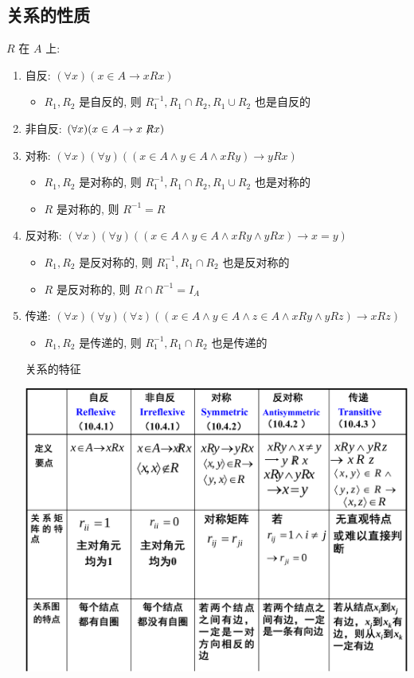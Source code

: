 \documentclass[11pt,a4paper,twocolumn,fleqn]{article} %
\begin{document}
\subsection{关系的性质} %
\label{sub:chara_of_relation}
$R$ 在 $A$ 上: 
\begin{enumerate}
	\item 自反: $(\forall x)(x\in A \to xRx)$
	\begin{itemize}
		\item $R_1, R_2$ 是自反的, 
		则 $R_1^{-1}, R_1\cap R_2, R_1\cup R_2$ 也是自反的
	\end{itemize}
	\item 非自反: $(\forall x)(x\in A \to x\not\negthickspace{R}x)$
	\item 对称: $(\forall x)(\forall y)((x\in A\land y \in A \land x R y)
	\to yRx)$
	\begin{itemize}
		\item $R_1, R_2$ 是对称的, 
		则 $R_1^{-1}, R_1\cap R_2, R_1\cup R_2$ 也是对称的
		\item $R$ 是对称的, 则 $R^{-1} = R$
	\end{itemize}
	\item 反对称: $(\forall x)(\forall y)(
	(x\in A\land y \in A \land xRy \land yRx)\to x=y)$
	\begin{itemize}
		\item $R_1, R_2$ 是反对称的, 
		则 $R_1^{-1}, R_1\cap R_2$ 也是反对称的
		\item $R$ 是反对称的, 则 $R\cap R^{-1} = I_A$
	\end{itemize}
	\item 传递: $(\forall x)(\forall y)(\forall z)
	((x\in A\land y\in A \land z\in A\land xRy\land yRz)\to xRz)$
	\begin{itemize}
		\item $R_1, R_2$ 是传递的, 
		则 $R_1^{-1}, R_1\cap R_2$ 也是传递的
	\end{itemize}
\begin{table}[!htp]
 \centering
 \caption{关系的特征}
 \includegraphics[width=\linewidth]{relationship.pdf}

\end{table}
\end{enumerate}
\end{document}
